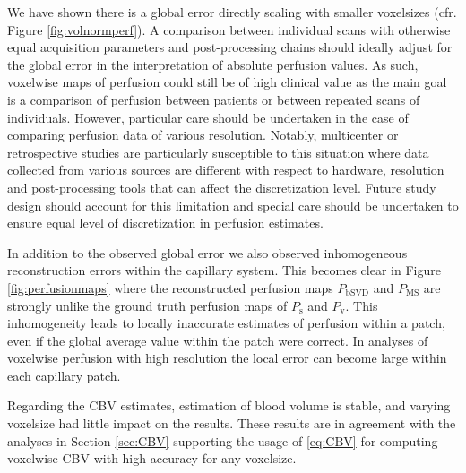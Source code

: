 \documentclass[final,5p,times,twocolumn]{elsarticle}
\begin{document}
We have shown there is a global error directly scaling with smaller voxelsizes (cfr. Figure \ref{fig:volnormperf}). A comparison between individual scans with otherwise equal acquisition parameters and post-processing chains should ideally adjust for the global error in the interpretation of absolute perfusion values. As such, voxelwise maps of perfusion could still be of high clinical value as the main goal is a comparison of perfusion between patients or between repeated scans of individuals. However, particular care should be undertaken in the case of comparing perfusion data of various resolution. Notably, multicenter or retrospective studies are particularly susceptible to this situation where data collected from various sources are different with respect to hardware, resolution and post-processing tools that can affect the discretization level. Future study design should account for this limitation and special care should be undertaken to ensure equal level of discretization in perfusion estimates. 

In addition to the observed global error we also observed inhomogeneous reconstruction errors within the capillary system. This becomes clear in Figure \ref{fig:perfusionmaps} where the reconstructed perfusion maps $P_{\mathrm{bSVD}}$ and $P_{\mathrm{MS}}$ are strongly unlike the ground truth perfusion maps of $P_{\mathrm{s}}$ and $P_{\mathrm{v}}$. This inhomogeneity leads to locally inaccurate estimates of perfusion within a patch, even if the global average value within the patch were correct. 
In analyses of voxelwise perfusion with high resolution the local error can become large within each capillary patch.
 
	Regarding the CBV estimates, estimation of blood volume is stable, and varying voxelsize had little impact on the results. These results are in agreement with the analyses in Section \ref{sec:CBV} supporting the usage of \eqref{eq:CBV} for computing voxelwise CBV with high accuracy for any voxelsize.
	
\end{document}
